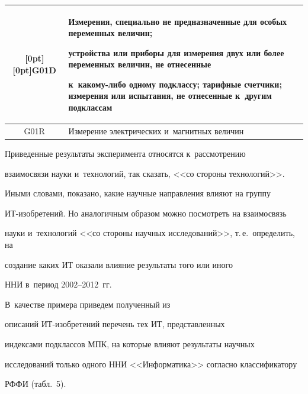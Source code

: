 \begin{table}[b]
\begin{center}
\begin{tabular}{|c|p{95mm}|}
\hline


\multicolumn{1}{|c|}{\raisebox{-22pt}[0pt][0pt]{G01D}}&Измерения, специально не предназначенные для особых переменных величин; 


устройства или приборы для измерения двух или более переменных величин, не отнесенные 


к~какому-либо одному подклассу; тарифные счетчики; измерения или испытания, не отнесенные к~другим подклассам\\


\hline


G01R&Измерение электрических и~магнитных величин\\


\hline


\end{tabular}


\end{center}


\end{table}





     Приведенные результаты эксперимента относятся к~рассмотрению 


взаимосвязи науки и~технологий, так сказать, <<со стороны технологий>>. 


Иными словами, показано, какие научные направления влияют на группу  


ИТ-изоб\-ре\-те\-ний. Но аналогичным образом можно посмотреть на взаимосвязь 


науки и~технологий <<со стороны научных исследований>>, т.\,е.\ определить, на 


создание каких ИТ оказали влияние результаты того или иного 


ННИ в~период 2002--2012~гг. 





В~качестве примера приведем полученный из 


описаний ИТ-изоб\-ре\-те\-ний перечень тех ИТ, представленных 


индексами подклассов МПК, на которые влияют результаты научных 


исследований только одного ННИ <<Информатика>> согласно классификатору 


РФФИ (табл.~5).


       


      


